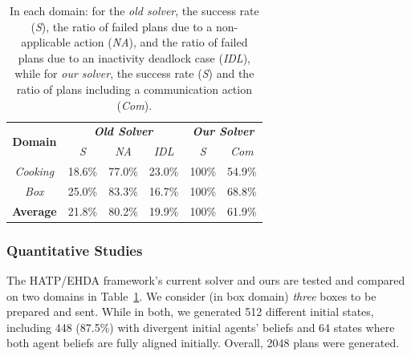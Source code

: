 \documentclass[letterpaper]{article} %
\begin{document}
\begin{table}
    \begin{adjustbox}{width=0.83\columnwidth,center}
    \begin{tabular}{@{}c|r r r|r r@{}}
        \multirow{2}{*}{
        \textbf{Domain}} & \multicolumn{3}{c|}{\textbf{\textit{Old Solver}}} & \multicolumn{2}{c}{\textbf{\textit{Our Solver}}}
        \\
        & \multicolumn{1}{c}{\textit{S}} & \multicolumn{1}{c}{\textit{NA}} & \multicolumn{1}{c|}{\textit{IDL}} & \multicolumn{1}{c}{\textit{S}} & \multicolumn{1}{c}{\textit{Com}} 
        \\ \cline{1-6}
        \textit{Cooking} & 18.6\% & 77.0\% & 23.0\% & 100\% & 54.9\%\\
        \textit{Box} & 25.0\% & 83.3\% & 16.7\% & 100\% & 68.8\%\\
        \hline
        \textbf{Average} & 21.8\% & 80.2\% & 19.9\% & 100\% & 61.9\%\\
    \end{tabular}
    \end{adjustbox}
    \caption
    {
    \label{tab:q_results}
    In each domain: for the \textit{old solver}, the success rate (\textit{S}), the ratio of failed plans due to a non-applicable action (\textit{NA}), and the ratio of failed plans due to an inactivity deadlock case (\textit{IDL}), while for \textit{our solver}, the success rate (\textit{S}) and the ratio of plans including a communication action (\textit{Com}).
    }
\end{table}

\subsubsection{Quantitative Studies}
The HATP/EHDA framework's current solver and ours are tested and compared on two domains in Table~\ref{tab:q_results}. We consider (in box domain) \textit{three} boxes to be prepared and sent. While in both, we generated 512 different initial states, including 448 (87.5\%) with divergent initial agents' beliefs and 64 states where both agent beliefs are fully aligned initially. Overall, 2048 plans were generated.
\end{document}
